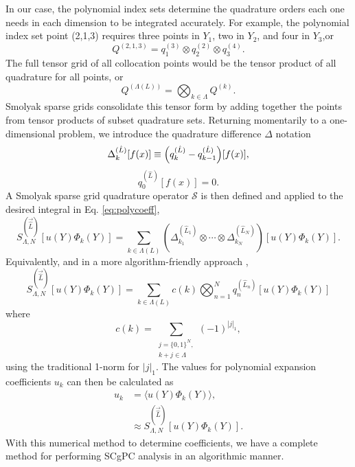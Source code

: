 In our case, the
polynomial index sets determine the quadrature orders each one needs in each dimension to be integrated
accurately.  For example, the polynomial index set point (2,1,3) requires three points in $Y_1$, two in $Y_2$,
and four in $Y_3$,or
\begin{equation}
  Q^{(2,1,3)} = q^{(3)}_1 \otimes q^{(2)}_2 \otimes q^{(4)}_3.
\end{equation}
The full tensor grid of all collocation points would be the tensor product of all quadrature for all points,
or
\begin{equation}
  Q^{(\Lambda(L))} = \bigotimes_{k\in\Lambda}Q^{(k)}.
\end{equation}
Smolyak sparse grids consolidate this tensor form by adding together the points from tensor products of subset
quadrature sets.  Returning momentarily to a one-dimensional problem, we introduce the quadrature difference 
$\Delta$ notation \cite{sparse1}
\begin{equation}
  \Delta_k^{(\hat L)}[f(x)] \equiv \qty(q_k^{(\hat L)} - q_{k-1}^{(\hat L)})[f(x)],
\end{equation}
\begin{equation}
  q_0^{(\hat L)}[f(x)] = 0.
\end{equation}
A Smolyak sparse grid quadrature operator $\mathcal S$ is then defined and applied to the desired integral in
Eq. \ref{eq:polycoeff},
\begin{equation}
  S^{(\vec{\hat L})}_{\Lambda,N}[u(Y)\Phi_k(Y)] = \sum_{k\in\Lambda(L)} \left(\Delta_{k_1}^{(\hat L_1)} \otimes \cdots \otimes
  \Delta_{k_N}^{(\hat L_N)}\right)[u(Y)\Phi_k(Y)].
\end{equation}
Equivalently, and in a more algorithm-friendly approach \cite{sparseSC},
\begin{equation}
  S^{(\vec{\hat L})}_{\Lambda,N}[u(Y)\Phi_k(Y)] = \sum_{k\in\Lambda(L)} c(k)\bigotimes_{n=1}^N
  q^{(\hat L_n)}_n[u(Y)\Phi_k(Y)]
\end{equation}
where
\begin{equation}
  c(k) = \sum_{\substack{j=\{0,1\}^N,\\k+j\in\Lambda}} (-1)^{|j|_1},
\end{equation}
using the traditional 1-norm for $|j|_1$.
The values for polynomial expansion coefficients $u_k$ can then be calculated as
\begin{align}
  u_k &= \langle u(Y)\Phi_k(Y) \rangle,\\
      &\approx S^{(\vec{\hat L})}_{\Lambda,N}[u(Y)\Phi_k(Y)].
\end{align}
With this numerical method to determine coefficients, we have a complete method for performing SCgPC
analysis in an algorithmic manner.


